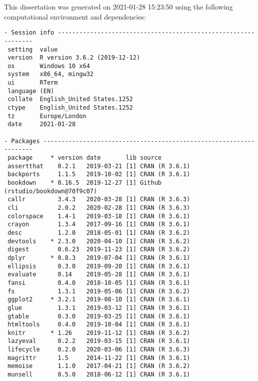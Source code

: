 \documentclass[12pt,twoside]{reedthesis}
\begin{document}
This dissertation was generated on 2021-01-28 15:23:50 using the following computational environment and dependencies:
\begin{verbatim}
- Session info ---------------------------------------------------------------
 setting  value                       
 version  R version 3.6.2 (2019-12-12)
 os       Windows 10 x64              
 system   x86_64, mingw32             
 ui       RTerm                       
 language (EN)                        
 collate  English_United States.1252  
 ctype    English_United States.1252  
 tz       Europe/London               
 date     2021-01-28                  

- Packages -------------------------------------------------------------------
 package     * version date       lib source                            
 assertthat    0.2.1   2019-03-21 [1] CRAN (R 3.6.1)                    
 backports     1.1.5   2019-10-02 [1] CRAN (R 3.6.1)                    
 bookdown    * 0.16.5  2019-12-27 [1] Github (rstudio/bookdown@70f9c07) 
 callr         3.4.3   2020-03-28 [1] CRAN (R 3.6.3)                    
 cli           2.0.2   2020-02-28 [1] CRAN (R 3.6.3)                    
 colorspace    1.4-1   2019-03-18 [1] CRAN (R 3.6.1)                    
 crayon        1.3.4   2017-09-16 [1] CRAN (R 3.6.1)                    
 desc          1.2.0   2018-05-01 [1] CRAN (R 3.6.2)                    
 devtools    * 2.3.0   2020-04-10 [1] CRAN (R 3.6.2)                    
 digest        0.6.23  2019-11-23 [1] CRAN (R 3.6.2)                    
 dplyr       * 0.8.3   2019-07-04 [1] CRAN (R 3.6.1)                    
 ellipsis      0.3.0   2019-09-20 [1] CRAN (R 3.6.1)                    
 evaluate      0.14    2019-05-28 [1] CRAN (R 3.6.1)                    
 fansi         0.4.0   2018-10-05 [1] CRAN (R 3.6.1)                    
 fs            1.3.1   2019-05-06 [1] CRAN (R 3.6.2)                    
 ggplot2     * 3.2.1   2019-08-10 [1] CRAN (R 3.6.1)                    
 glue          1.3.1   2019-03-12 [1] CRAN (R 3.6.1)                    
 gtable        0.3.0   2019-03-25 [1] CRAN (R 3.6.1)                    
 htmltools     0.4.0   2019-10-04 [1] CRAN (R 3.6.1)                    
 knitr       * 1.26    2019-11-12 [1] CRAN (R 3.6.2)                    
 lazyeval      0.2.2   2019-03-15 [1] CRAN (R 3.6.1)                    
 lifecycle     0.2.0   2020-03-06 [1] CRAN (R 3.6.3)                    
 magrittr      1.5     2014-11-22 [1] CRAN (R 3.6.1)                    
 memoise       1.1.0   2017-04-21 [1] CRAN (R 3.6.2)                    
 munsell       0.5.0   2018-06-12 [1] CRAN (R 3.6.1)                    

\end{verbatim}
\end{document}
